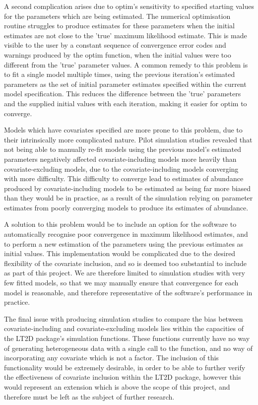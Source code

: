 \documentclass[11pt]{article}
\begin{document}
\begin{multicols}{2}
A second complication arises due to optim's sensitivity to specified starting values for the parameters which are being estimated. The numerical optimisation routine struggles to produce estimates for these parameters when the initial estimates are not close to the 'true' maximum likelihood estimate. This is made visible to the user by a constant sequence of convergence error codes and warnings produced by the optim function, when the initial values were too different from the 'true' parameter values. A common remedy to this problem is to fit a single model multiple times, using the previous iteration's estimated parameters as the set of initial parameter estimates specified within the current model specification. This reduces the difference between the 'true' parameters and the supplied initial values with each iteration, making it easier for optim to converge.

Models which have covariates specified are more prone to this problem, due to their intrinsically more complicated nature. Pilot simulation studies revealed that not being able to manually re-fit models using the previous model's estimated parameters negatively affected covariate-including models more heavily than covariate-excluding models, due to the covariate-including models converging with more difficulty. This difficulty to converge lead to estimates of abundance produced by covariate-including models to be estimated as being far more biased than they would be in practice, as a result of the simulation relying on parameter estimates from poorly converging models to produce its estimates of abundance.

A solution to this problem would be to include an option for the software to automatically recognise poor convergence in maximum likelihood estimates, and to perform a new estimation of the parameters using the previous estimates as initial values. This implementation would be complicated due to the desired flexibility of the covariate inclusion, and so is deemed too substantial to include as part of this project. We are therefore limited to simulation studies with very few fitted models, so that we may manually ensure that convergence for each model is reasonable, and therefore representative of the software's performance in practice. 

The final issue with producing simulation studies to compare the bias between covariate-including and covariate-excluding models lies within the capacities of the LT2D package's simulation functions. These functions currently have no way of generating heterogeneous data with a single call to the function, and no way of incorporating any covariate which is not a factor. The inclusion of this functionality would be extremely desirable, in order to be able to further verify the effectiveness of covariate inclusion within the LT2D package, however this would represent an extension which is above the scope of this project, and therefore must be left as the subject of further research. 


\end{multicols}
\end{document}
